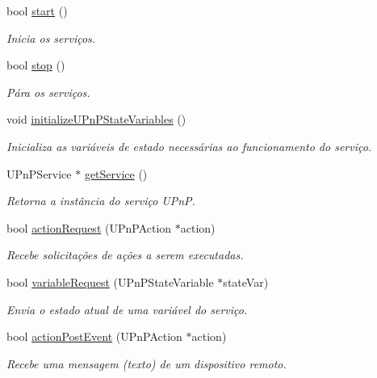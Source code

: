 \begin{DoxyCompactItemize}
\item 
bool \hyperlink{classbr_1_1ufscar_1_1lince_1_1mmi_1_1upnp_1_1MMIService_a34c70b44f4b7491dc2e9a398423ef974}{start} ()
\begin{DoxyCompactList}\small\item\em Inicia os serviços. \item\end{DoxyCompactList}\item 
bool \hyperlink{classbr_1_1ufscar_1_1lince_1_1mmi_1_1upnp_1_1MMIService_a0687c9dbf5bbbaa2b490e19bb88a1a51}{stop} ()
\begin{DoxyCompactList}\small\item\em Pára os serviços. \item\end{DoxyCompactList}\item 
void \hyperlink{classbr_1_1ufscar_1_1lince_1_1mmi_1_1upnp_1_1MMIService_a0163a8a90ce5a43daad480795d323f5c}{initializeUPnPStateVariables} ()
\begin{DoxyCompactList}\small\item\em Inicializa as variáveis de estado necessárias ao funcionamento do serviço. \item\end{DoxyCompactList}\item 
UPnPService $\ast$ \hyperlink{classbr_1_1ufscar_1_1lince_1_1mmi_1_1upnp_1_1MMIService_aadd21fd9892177f42ca1e002b5dc6432}{getService} ()
\begin{DoxyCompactList}\small\item\em Retorna a instância do serviço UPnP. \item\end{DoxyCompactList}\item 
bool \hyperlink{classbr_1_1ufscar_1_1lince_1_1mmi_1_1upnp_1_1MMIService_a7fb929d5234cabe8bccffcbace4a97dc}{actionRequest} (UPnPAction $\ast$action)
\begin{DoxyCompactList}\small\item\em Recebe solicitações de ações a serem executadas. \item\end{DoxyCompactList}\item 
bool \hyperlink{classbr_1_1ufscar_1_1lince_1_1mmi_1_1upnp_1_1MMIService_a1e6559d7dbe7372d8f60e451ac157935}{variableRequest} (UPnPStateVariable $\ast$stateVar)
\begin{DoxyCompactList}\small\item\em Envia o estado atual de uma variável do serviço. \item\end{DoxyCompactList}\item 
bool \hyperlink{classbr_1_1ufscar_1_1lince_1_1mmi_1_1upnp_1_1MMIService_abd5a9ef1a311388d61cfe7c1a8380f56}{actionPostEvent} (UPnPAction $\ast$action)
\begin{DoxyCompactList}\small\item\em Recebe uma mensagem (texto) de um dispositivo remoto. \item\end{DoxyCompactList}\end{DoxyCompactItemize}
